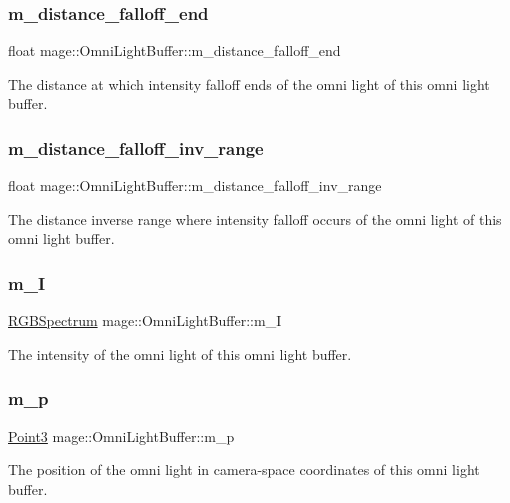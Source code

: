 \subsubsection{\texorpdfstring{m\+\_\+distance\+\_\+falloff\+\_\+end}{m\_distance\_falloff\_end}}
{\footnotesize\ttfamily float mage\+::\+Omni\+Light\+Buffer\+::m\+\_\+distance\+\_\+falloff\+\_\+end}

The distance at which intensity falloff ends of the omni light of this omni light buffer. \hypertarget{structmage_1_1_omni_light_buffer_ad852b5cdf1751e860a2549aaa5f20769}{}\label{structmage_1_1_omni_light_buffer_ad852b5cdf1751e860a2549aaa5f20769} 
\subsubsection{\texorpdfstring{m\+\_\+distance\+\_\+falloff\+\_\+inv\+\_\+range}{m\_distance\_falloff\_inv\_range}}
{\footnotesize\ttfamily float mage\+::\+Omni\+Light\+Buffer\+::m\+\_\+distance\+\_\+falloff\+\_\+inv\+\_\+range}

The distance inverse range where intensity falloff occurs of the omni light of this omni light buffer. \hypertarget{structmage_1_1_omni_light_buffer_ac3273113ad647103c911bbbf6bb41697}{}\label{structmage_1_1_omni_light_buffer_ac3273113ad647103c911bbbf6bb41697} 
\subsubsection{\texorpdfstring{m\+\_\+I}{m\_I}}
{\footnotesize\ttfamily \hyperlink{structmage_1_1_r_g_b_spectrum}{R\+G\+B\+Spectrum} mage\+::\+Omni\+Light\+Buffer\+::m\+\_\+I}

The intensity of the omni light of this omni light buffer. \hypertarget{structmage_1_1_omni_light_buffer_a777b98a686a7e39bd7b401748629d9fc}{}\label{structmage_1_1_omni_light_buffer_a777b98a686a7e39bd7b401748629d9fc} 
\subsubsection{\texorpdfstring{m\+\_\+p}{m\_p}}
{\footnotesize\ttfamily \hyperlink{structmage_1_1_point3}{Point3} mage\+::\+Omni\+Light\+Buffer\+::m\+\_\+p}

The position of the omni light in camera-\/space coordinates of this omni light buffer. 